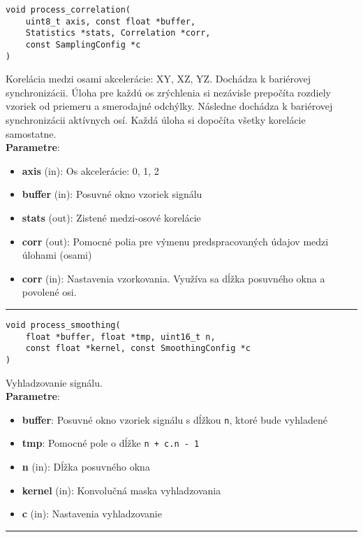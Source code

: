 \begin{lstlisting}[style=docs]
void process_correlation(
	uint8_t axis, const float *buffer, 
	Statistics *stats, Correlation *corr, 
	const SamplingConfig *c
)
\end{lstlisting}
Korelácia medzi osami akcelerácie: XY, XZ, YZ. Dochádza k bariérovej synchronizácii. 
Úloha pre každú os zrýchlenia si nezávisle prepočíta rozdiely vzoriek od priemeru a smerodajné odchýlky.
Následne dochádza k bariérovej synchronizácii aktívnych osí. Každá úloha si dopočíta všetky korelácie
samostatne.  \\ 
\textbf{Parametre}:
\begin{itemize}[noitemsep, topsep=0pt]
	\item \textbf{axis} (in): Os akcelerácie: 0, 1, 2
 	\item \textbf{buffer} (in): Posuvné okno vzoriek signálu          
 	\item \textbf{stats} (out): Zistené medzi-osové korelácie
 	\item \textbf{corr} (out): Pomocné polia pre výmenu predspracovaných údajov medzi úlohami (osami)
 	\item \textbf{corr} (in): Nastavenia vzorkovania. Využíva sa dĺžka posuvného okna a povolené osi.
\end{itemize}
\bigbreak
\hrule

\begin{lstlisting}[style=docs]
void process_smoothing(
	float *buffer, float *tmp, uint16_t n, 
	const float *kernel, const SmoothingConfig *c
)
\end{lstlisting}
Vyhladzovanie signálu. \\ 
\textbf{Parametre}:
\begin{itemize}[noitemsep, topsep=0pt]
	\item \textbf{buffer}: Posuvné okno vzoriek signálu s dĺžkou \verb|n|, ktoré bude vyhladené
	\item \textbf{tmp}: Pomocné pole o dĺžke \verb|n + c.n - 1|
 	\item \textbf{n} (in): Dĺžka posuvného okna
 	\item \textbf{kernel} (in): Konvolučná maska vyhladzovania
 	\item \textbf{c} (in): Nastavenia vyhladzovanie
\end{itemize}
\bigbreak
\hrule

